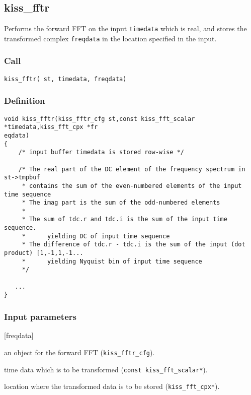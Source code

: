 \subsection{{kiss\_fftr}}
Performs the forward FFT on the input \texttt{timedata} which is real, and stores the transformed complex \texttt{freqdata} in the location specified in the input.

\subsubsection*{Call}
\begin{verbatim}kiss_fftr( st, timedata, freqdata)\end{verbatim}

\subsubsection*{Definition}
\begin{verbatim}
void kiss_fftr(kiss_fftr_cfg st,const kiss_fft_scalar *timedata,kiss_fft_cpx *fr
eqdata)
{
    /* input buffer timedata is stored row-wise */

    /* The real part of the DC element of the frequency spectrum in st->tmpbuf
     * contains the sum of the even-numbered elements of the input time sequence
     * The imag part is the sum of the odd-numbered elements
     *
     * The sum of tdc.r and tdc.i is the sum of the input time sequence. 
     *      yielding DC of input time sequence
     * The difference of tdc.r - tdc.i is the sum of the input (dot product) [1,-1,1,-1... 
     *      yielding Nyquist bin of input time sequence
     */
 
   ...
}
\end{verbatim}

\subsubsection*{Input parameters}
\begin{desclist}{\tt}{\quad}[freqdata]
   \setlength\itemsep{0pt}
   \item[st]       an object for the forward FFT (\texttt{kiss\_fftr\_cfg}).  
   \item[timedata] time data which is to be transformed (\texttt{const kiss\_fft\_scalar*}).  
   \item[freqdata] location where the transformed data is to be stored (\texttt{kiss\_fft\_cpx*}).
\end{desclist}




